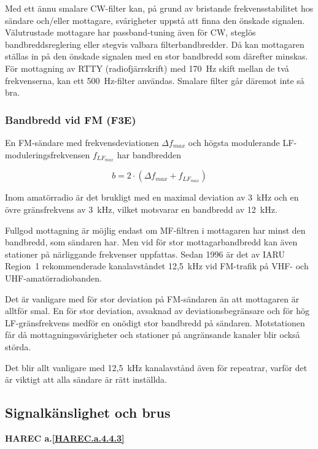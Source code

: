 Med ett ännu smalare CW-filter kan, på grund av bristande frekvensstabilitet hos
sändare och/eller mottagare, svårigheter uppstå att finna den önskade signalen.
Välutrustade mottagare har passband-tuning även för CW, steglös
bandbreddsreglering eller stegvis valbara filterbandbredder.
Då kan mottagaren ställas in på den önskade signalen med en stor bandbredd
som därefter minskas.
För mottagning av RTTY (radiofjärrskrift) med 170~Hz skift mellan de två
frekvenserna, kan ett 500~Hz-filter användas.
Smalare filter går däremot inte så bra.

\subsubsection{Bandbredd vid FM (F3E)}

En FM-sändare med frekvensdeviationen \(\Delta f_{max}\) och högsta
modulerande LF-moduleringsfrekvensen \(f_{LF_{max}}\) har bandbredden

\[ b = 2 \cdot (\Delta f_{max} + f_{LF_{max}}) \]

Inom amatörradio är det brukligt med en maximal deviation av 3~kHz och
en övre gränsfrekvens av 3~kHz, vilket motsvarar en bandbredd av 12~kHz.

Fullgod mottagning är möjlig endast om MF-filtren i mottagaren har
minst den bandbredd, som sändaren har.
Men vid för stor mottagarbandbredd kan även stationer på närliggande frekvenser
uppfattas.
Sedan 1996 är det av IARU Region~1 rekommenderade kanalavståndet 12,5~kHz
vid FM-trafik på VHF- och UHF-amatörradiobanden.

Det är vanligare med för stor deviation på FM-sändaren än att
mottagaren är alltför smal.
En för stor deviation, avsaknad av deviationsbegränsare och för hög
LF-gränsfrekvens medför en onödigt stor bandbredd på sändaren.
Motstationen får då mottagningssvårigheter och stationer på angränsande
kanaler blir också störda.

Det blir allt vanligare med 12,5~kHz kanalavstånd även för repeatrar,
varför det är viktigt att alla sändare är rätt inställda.

\subsection{Signalkänslighet och brus}
\textbf{HAREC a.\ref{HAREC.a.4.4.3}\label{myHAREC.a.4.4.3}}

